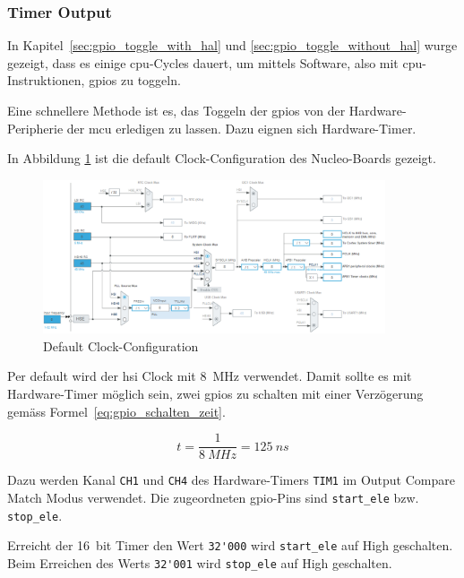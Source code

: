 \documentclass[11pt,a4paper,hidelinks]{article}
\begin{document}
\subsubsection{Timer Output}\label{sec:timer_output}

In Kapitel~\ref{sec:gpio_toggle_with_hal} und \ref{sec:gpio_toggle_without_hal} wurge gezeigt, dass es einige
\acrshort{cpu}-Cycles dauert, um  mittels Software, also mit \acrshort{cpu}-Instruktionen, \acrshort{gpio}s zu toggeln.

Eine schnellere Methode ist es, das Toggeln der \acrshort{gpio}s von der Hardware-Peripherie der \acrshort{mcu}
erledigen zu lassen. Dazu eignen sich Hardware-Timer.

In Abbildung \ref{fig:clock_config_default} ist die default Clock-Configuration des Nucleo-Boards gezeigt.

\begin{figure}[H]
    \centering
    \includegraphics[width=0.9\textwidth]{graphics/clock_config_default.png}
    \caption{Default Clock-Configuration}\label{fig:clock_config_default}
\end{figure}

Per default wird der \acrfull{hsi} Clock mit 8~MHz verwendet. Damit sollte es mit Hardware-Timer möglich sein, zwei
\acrshort{gpio}s zu schalten mit einer Verzögerung gemäss Formel~\ref{eq:gpio_schalten_zeit}.

\begin{equation}\label{eq:gpio_schalten_zeit}
    t = \frac{1}{8~MHz} = 125~ns
\end{equation}

Dazu werden Kanal \lstinline|CH1| und \lstinline|CH4| des Hardware-Timers \lstinline|TIM1| im Output Compare Match Modus
verwendet. Die zugeordneten \acrshort{gpio}-Pins sind \lstinline|start_ele| bzw. \lstinline|stop_ele|.

Erreicht der 16~bit Timer den Wert \lstinline|32'000| wird \lstinline|start_ele| auf High geschalten. Beim Erreichen des
Werts \lstinline|32'001| wird \lstinline|stop_ele| auf High geschalten.
\end{document}
